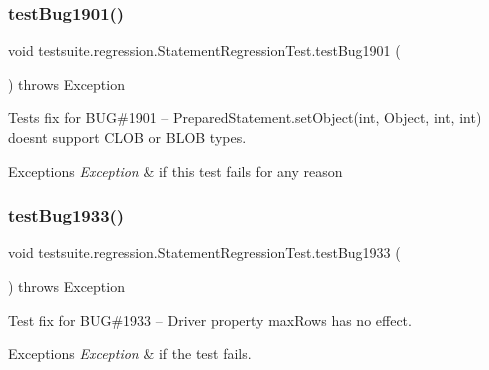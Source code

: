 \subsubsection{\texorpdfstring{test\+Bug1901()}{testBug1901()}}
{\footnotesize\ttfamily void testsuite.\+regression.\+Statement\+Regression\+Test.\+test\+Bug1901 (\begin{DoxyParamCaption}{ }\end{DoxyParamCaption}) throws Exception}

Tests fix for B\+UG\#1901 -- Prepared\+Statement.\+set\+Object(int, Object, int, int) doesn\textquotesingle{}t support C\+L\+OB or B\+L\+OB types.


\begin{DoxyExceptions}{Exceptions}
{\em Exception} & if this test fails for any reason \\
\hline
\end{DoxyExceptions}
\mbox{\label{classtestsuite_1_1regression_1_1_statement_regression_test_a61d09502580908ecb2e973f8f3f22d51}} 
\subsubsection{\texorpdfstring{test\+Bug1933()}{testBug1933()}}
{\footnotesize\ttfamily void testsuite.\+regression.\+Statement\+Regression\+Test.\+test\+Bug1933 (\begin{DoxyParamCaption}{ }\end{DoxyParamCaption}) throws Exception}

Test fix for B\+UG\#1933 -- Driver property \textquotesingle{}max\+Rows\textquotesingle{} has no effect.


\begin{DoxyExceptions}{Exceptions}
{\em Exception} & if the test fails. \\
\hline
\end{DoxyExceptions}
\mbox{\label{classtestsuite_1_1regression_1_1_statement_regression_test_ae2d0f6ab42a969173a360bf53143ef7d}} 
